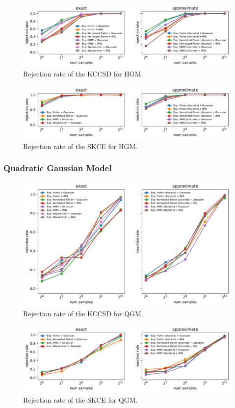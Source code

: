 \documentclass{uai2023} %
\begin{document}
\begin{figure}[!htb]
    \centering
    \includegraphics[width=\linewidth]{paper/figures/hgm_kccsd.pdf}
    \caption{Rejection rate of the KCCSD for HGM.}
    \label{fig:hgm_kccsd}
\end{figure}

\begin{figure}[!htb]
    \centering
    \includegraphics[width=\linewidth]{paper/figures/hgm_skce.pdf}
    \caption{Rejection rate of the SKCE for HGM.}
    \label{fig:hgm_skce}
\end{figure}

\subsubsection{Quadratic Gaussian Model}

\begin{figure}[!htb]
    \centering
    \includegraphics[width=\linewidth]{paper/figures/qgm_kccsd.pdf}
    \caption{Rejection rate of the KCCSD for QGM.}
    \label{fig:qgm_kccsd}
\end{figure}

\begin{figure}[!htb]
    \centering
    \includegraphics[width=\linewidth]{paper/figures/qgm_skce.pdf}
    \caption{Rejection rate of the SKCE for QGM.}
    \label{fig:qgm_skce}
\end{figure}


\end{document}
